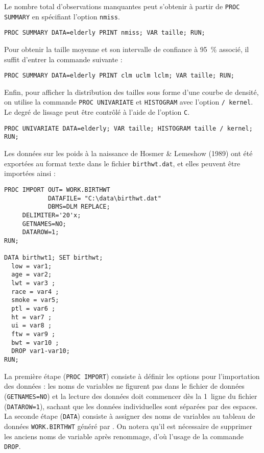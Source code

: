 Le nombre total d'observations manquantes peut s'obtenir à partir de
\texttt{PROC SUMMARY} en spécifiant l'option \texttt{nmiss}.
\begin{verbatim}
PROC SUMMARY DATA=elderly PRINT nmiss; VAR taille; RUN;
\end{verbatim}

Pour obtenir la taille moyenne et son intervalle de confiance à 95~\%
associé, il suffit d'entrer la commande suivante :
\begin{verbatim}
PROC SUMMARY DATA=elderly PRINT clm uclm lclm; VAR taille; RUN;
\end{verbatim}

Enfin, pour afficher la distribution des tailles sous forme d'une courbe de
densité, on utilise la commande \texttt{PROC UNIVARIATE} et
\texttt{HISTOGRAM} avec l'option \texttt{/ kernel}. Le degré de lissage peut
être contrôlé à l'aide de l'option \texttt{C}.
\begin{verbatim}
PROC UNIVARIATE DATA=elderly; VAR taille; HISTOGRAM taille / kernel; RUN;
\end{verbatim}
%
%
%
\soln{\ref{exo:8.6}}
Les données sur les poids à la naissance de Hosmer \& Lemeshow (1989) ont
été exportées au format texte dans le fichier \texttt{birthwt.dat}, et elles
peuvent être importées ainsi :
\begin{verbatim}
PROC IMPORT OUT= WORK.BIRTHWT
            DATAFILE= "C:\data\birthwt.dat"
            DBMS=DLM REPLACE;
     DELIMITER='20'x;
     GETNAMES=NO;
     DATAROW=1;
RUN;

DATA birthwt1; SET birthwt;
  low = var1;
  age = var2;
  lwt = var3 ;
  race = var4 ;
  smoke = var5;
  ptl = var6 ;
  ht = var7 ;
  ui = var8 ;
  ftw = var9 ;
  bwt = var10 ;
  DROP var1-var10;
RUN;
\end{verbatim}
La première étape (\texttt{PROC IMPORT}) consiste à définir les options pour
l'importation des données : les noms de variables ne figurent pas dans le
fichier de données (\texttt{GETNAMES=NO}) et la lecture des données doit
commencer dès la 1\iere\ ligne du fichier (\texttt{DATAROW=1}), sachant que
les données individuelles sont séparées par des espaces. La seconde étape
(\texttt{DATA}) consiste à assigner des noms de variables au tableau de
données \texttt{WORK.BIRTHWT} généré par \SAS. On notera qu'il est
nécessaire de supprimer les anciens noms de variable après renommage, d'où
l'usage de la commande \texttt{DROP}.

